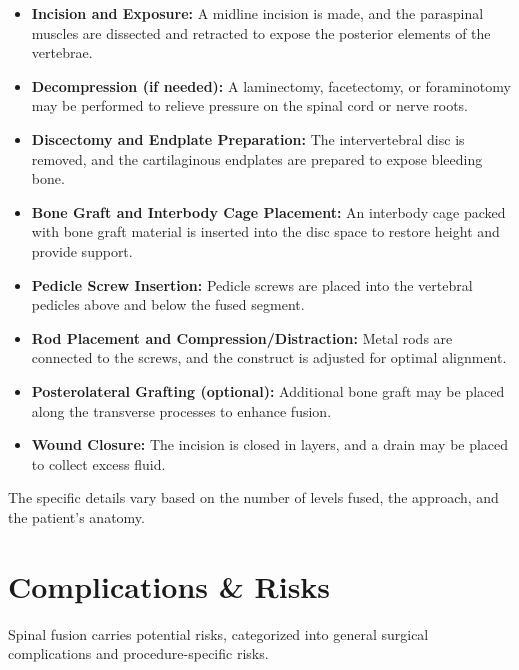 \begin{itemize}
  \item \textbf{Incision and Exposure:} A midline incision is made, and the paraspinal muscles are dissected and retracted to expose the posterior elements of the vertebrae.
  \item \textbf{Decompression (if needed):} A laminectomy, facetectomy, or foraminotomy may be performed to relieve pressure on the spinal cord or nerve roots.
  \item \textbf{Discectomy and Endplate Preparation:} The intervertebral disc is removed, and the cartilaginous endplates are prepared to expose bleeding bone.
  \item \textbf{Bone Graft and Interbody Cage Placement:} An interbody cage packed with bone graft material is inserted into the disc space to restore height and provide support.
  \item \textbf{Pedicle Screw Insertion:} Pedicle screws are placed into the vertebral pedicles above and below the fused segment.
  \item \textbf{Rod Placement and Compression/Distraction:} Metal rods are connected to the screws, and the construct is adjusted for optimal alignment.
  \item \textbf{Posterolateral Grafting (optional):} Additional bone graft may be placed along the transverse processes to enhance fusion.
  \item \textbf{Wound Closure:} The incision is closed in layers, and a drain may be placed to collect excess fluid.
\end{itemize}

The specific details vary based on the number of levels fused, the approach, and the patient's anatomy.

\section*{Complications \& Risks}
Spinal fusion carries potential risks, categorized into general surgical complications and procedure-specific risks.

